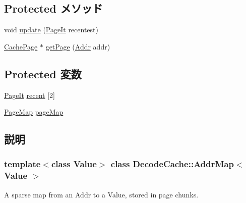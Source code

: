 \subsection*{Protected メソッド}
\begin{DoxyCompactItemize}
\item 
void \hyperlink{classDecodeCache_1_1AddrMap_a64083eea3dfcfac02ed16f18d154f852}{update} (\hyperlink{classDecodeCache_1_1AddrMap_af0021638c8ab5f47787c8c1973a125b8}{PageIt} recentest)
\item 
\hyperlink{structDecodeCache_1_1AddrMap_1_1CachePage}{CachePage} $\ast$ \hyperlink{classDecodeCache_1_1AddrMap_a5eb5de403aecd89f1133b26ad171f51c}{getPage} (\hyperlink{base_2types_8hh_af1bb03d6a4ee096394a6749f0a169232}{Addr} addr)
\end{DoxyCompactItemize}
\subsection*{Protected 変数}
\begin{DoxyCompactItemize}
\item 
\hyperlink{classDecodeCache_1_1AddrMap_af0021638c8ab5f47787c8c1973a125b8}{PageIt} \hyperlink{classDecodeCache_1_1AddrMap_ad803f96f3c59c58b1bcf96eb322bec9e}{recent} \mbox{[}2\mbox{]}
\item 
\hyperlink{classDecodeCache_1_1AddrMap_a975f1d72d35f5fb84de6f419b04bf347}{PageMap} \hyperlink{classDecodeCache_1_1AddrMap_a4bcb45c0276447d77068a80d6def657d}{pageMap}
\end{DoxyCompactItemize}


\subsection{説明}
\subsubsection*{template$<$class Value$>$ class DecodeCache::AddrMap$<$ Value $>$}

A sparse map from an Addr to a Value, stored in page chunks. 

